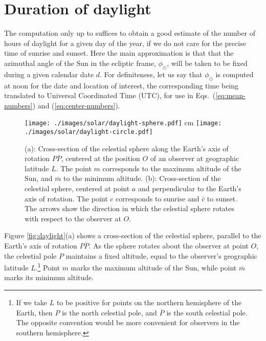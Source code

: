 \section{Duration of daylight}

The computation only up to  suffices to obtain a good estimate of the number of hours of daylight for a given day of the year, if we do not care for the precise time of sunrise and sunset.  Here the main approximation is that that the azimuthal angle of the Sun in the ecliptic frame, $\phi_\odot$, will be taken to be fixed during a given calendar date $d$.  For definiteness, let us say that $\phi_\odot$ is computed at noon for the date and location of interest, the corresponding time being translated to Universal Coordinated Time (UTC), for use in Eqs.~(\ref{eq:mean-numbers}) and (\ref{eq:center-numbers}).

\begin{figure} [t]
\begin{center}
	\texttt{[image: ./images/solar/daylight-sphere.pdf]}  cm
	\texttt{[image: ./images/solar/daylight-circle.pdf]}
\end{center}
\caption{\small (a): Cross-section of the celestial sphere along the Earth's axis of rotation $P \overline P$, centered at the position $O$ of an observer at geographic latitude $L$.  The point $m$ corresponds to the maximum altitude of the Sun, and $\overline m$ to the minimum altitude.  (b): Cross-section of the celestial sphere, centered at point $a$ and perpendicular to the Earth's axis of rotation.  The point $c$ corresponds to sunrise and $\bar c$ to sunset.  The arrows show the direction in which the celestial sphere rotates with respect to the observer at $O$.}
\end{figure}

Figure \ref{fig:daylight}(a) shows a cross-section of the celestial sphere, parallel to the Earth's axis of rotation $P \overline P$.  As the sphere rotates about the observer at point $O$, the celestial pole $P$ maintains a fixed altitude, equal to the observer's geographic latitude $L$.\footnote{If we take $L$ to be positive for points on the northern hemisphere of the Earth, then $P$ is the north celestial pole, and $\overline P$ is the south celestial pole.  The opposite convention would be more convenient for observers in the southern hemisphere.}  Point $m$ marks the maximum altitude of the Sun, while point $\overline m$ marks its minimum altitude.

